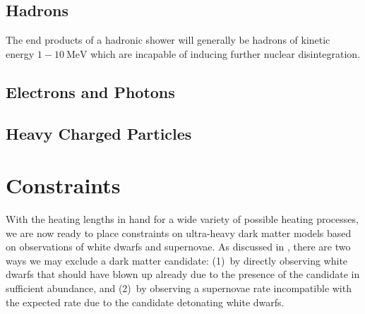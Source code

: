 \documentclass[twocolumn,showpacs,preprintnumbers,amsmath,amssymb,prd]{revtex4}
\begin{document}
\subsection{Hadrons}

The end products of a hadronic shower will generally be hadrons of kinetic energy $1-10 ~\text{MeV}$ which are incapable of inducing further nuclear disintegration.

\subsection{Electrons and Photons}

\subsection{Heavy Charged Particles}


\section{Constraints}
\label{sec:Constraints}

With the heating lengths in hand for a wide variety of possible heating processes, we are now ready to place constraints on ultra-heavy dark matter models based on observations of white dwarfs and supernovae. As discussed in \cite{Graham:2015apa}, there are two ways we may exclude a dark matter candidate: (1)~by directly observing white dwarfs that should have blown up already due to the presence of the candidate in sufficient abundance, and (2)~by observing a supernovae rate incompatible with the expected rate due to the candidate detonating white dwarfs. 
\end{document}
